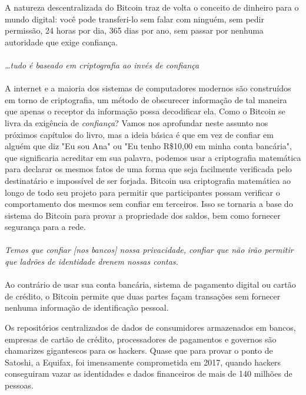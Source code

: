 A natureza descentralizada do Bitcoin traz de volta o conceito de dinheiro para o mundo digital: você pode transferi-lo sem falar com ninguém, sem pedir permissão, 24 horas por dia, 365 dias por ano, sem passar por nenhuma autoridade que exige confiança.

\paragraph{}
\textit{\dots tudo é baseado em criptografia ao invés de confiança}
\paragraph{}

A internet e a maioria dos sistemas de computadores modernos são construídos em torno de criptografia, um método de obscurecer informação de tal maneira que apenas o receptor da informação possa decodificar ela.
Como o Bitcoin se livra da exigência de \textit{confiança}? Vamos nos aprofundar neste assunto nos próximos capítulos do livro, mas a ideia básica é que em vez de confiar em alguém que diz "Eu sou Ana" ou "Eu tenho R\$10,00 em minha conta bancária", que significaria acreditar em sua palavra, podemos usar a criptografia matemática para declarar os mesmos fatos de uma forma que seja facilmente verificada pelo destinatário e impossível de ser forjada.
Bitcoin usa criptografia matemática ao longo de todo seu projeto para permitir que participantes possam verificar o comportamento dos mesmos sem confiar em terceiros.
Isso se tornaria a base do sistema do Bitcoin para provar a propriedade dos saldos, bem como fornecer segurança para a rede.

\paragraph{}
\textit{Temos que confiar [nos bancos] nossa privacidade, confiar que não irão permitir que ladrões de identidade drenem nossas contas.}
\paragraph{}

Ao contrário de usar sua conta bancária, sistema de pagamento digital ou cartão de crédito, o Bitcoin permite que duas partes façam transações sem fornecer nenhuma informação de identificação pessoal.

Os repositórios centralizados de dados de consumidores armazenados em bancos, empresas de cartão de crédito, processadores de pagamentos e governos são chamarizes gigantescos para os hackers. Quase que para provar o ponto de Satoshi, a Equifax, foi imensamente comprometida em 2017, quando hackers conseguiram vazar as identidades e dados financeiros de mais de 140 milhões de pessoas.

